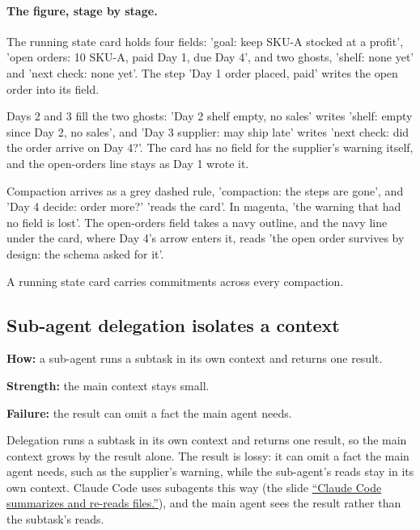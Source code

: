 \paragraph{The figure, stage by stage.}
\be
\item The running state card holds four fields: 'goal: keep SKU-A stocked at a profit', 'open orders: 10 SKU-A, paid Day 1, due Day 4', and two ghosts, 'shelf: none yet' and 'next check: none yet'. The step 'Day 1 order placed, paid' writes the open order into its field.
\item Days 2 and 3 fill the two ghosts: 'Day 2 shelf empty, no sales' writes 'shelf: empty since Day 2, no sales', and 'Day 3 supplier: may ship late' writes 'next check: did the order arrive on Day 4?'. The card has no field for the supplier's warning itself, and the open-orders line stays as Day 1 wrote it.
\item Compaction arrives as a grey dashed rule, 'compaction: the steps are gone', and 'Day 4 decide: order more?' 'reads the card'. In magenta, 'the warning that had no field is lost'. The open-orders field takes a navy outline, and the navy line under the card, where Day 4's arrow enters it, reads 'the open order survives by design: the schema asked for it'.
\ee

\begin{takeaway}A running state card carries commitments across every compaction.\end{takeaway}

\subsection{Sub-agent delegation isolates a context}
\label{sec:it-7-4e}

\bi
\item \textbf{How:} a sub-agent runs a subtask in its own context and returns one result.
\item \textbf{Strength:} the main context stays small.
\item \textbf{Failure:} the result can omit a fact the main agent needs.
\ei

Delegation runs a subtask in its own context and returns one result, so the main context grows by the result alone. The result is lossy: it can omit a fact the main agent needs, such as the supplier's warning, while the sub-agent's reads stay in its own context. Claude Code uses subagents this way (the slide \hyperref[sec:it-7-5b]{``Claude Code summarizes and re-reads files.''}), and the main agent sees the result rather than the subtask's reads.

